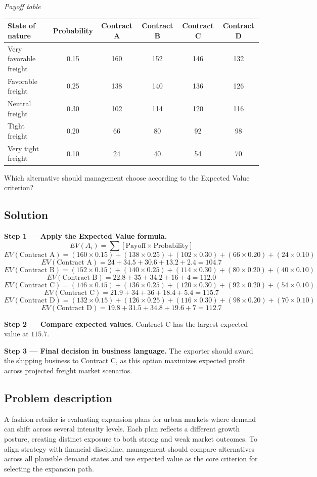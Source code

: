 \begin{ExamProblems}
		\begin{center}
			\textit{Payoff table}
			\begin{tabular}{l c c c c c}
				\toprule
				State of nature & Probability & Contract A & Contract B & Contract C & Contract D \\
				\midrule
				Very favorable freight & 0.15 & 160 & 152 & 146 & 132 \\
				Favorable freight & 0.25 & 138 & 140 & 136 & 126 \\
				Neutral freight & 0.30 & 102 & 114 & 120 & 116 \\
				Tight freight & 0.20 & 66 & 80 & 92 & 98 \\
				Very tight freight & 0.10 & 24 & 40 & 54 & 70 \\
				\bottomrule
			\end{tabular}
		\end{center}

		Which alternative should management choose according to the Expected Value criterion?

		\subsection*{Solution}
		\textbf{Step 1 --- Apply the Expected Value formula.}
		\[
		EV(A_i)=\sum [\text{Payoff}\times\text{Probability}]
		\]
		\[
		EV(\text{Contract A})=(160\times0.15)+(138\times0.25)+(102\times0.30)+(66\times0.20)+(24\times0.10)
		\]
		\[
		EV(\text{Contract A})=24+34.5+30.6+13.2+2.4=104.7
		\]
		\[
		EV(\text{Contract B})=(152\times0.15)+(140\times0.25)+(114\times0.30)+(80\times0.20)+(40\times0.10)
		\]
		\[
		EV(\text{Contract B})=22.8+35+34.2+16+4=112.0
		\]
		\[
		EV(\text{Contract C})=(146\times0.15)+(136\times0.25)+(120\times0.30)+(92\times0.20)+(54\times0.10)
		\]
		\[
		EV(\text{Contract C})=21.9+34+36+18.4+5.4=115.7
		\]
		\[
		EV(\text{Contract D})=(132\times0.15)+(126\times0.25)+(116\times0.30)+(98\times0.20)+(70\times0.10)
		\]
		\[
		EV(\text{Contract D})=19.8+31.5+34.8+19.6+7=112.7
		\]
		
		\textbf{Step 2 --- Compare expected values.}
		Contract C has the largest expected value at $115.7$.
		
		\textbf{Step 3 --- Final decision in business language.}
		The exporter should award the shipping business to Contract C, as this option maximizes expected profit across projected freight market scenarios.		\item
		\subsection*{Problem description}
		A fashion retailer is evaluating expansion plans for urban markets where demand can shift across several intensity levels. Each plan reflects a different growth posture, creating distinct exposure to both strong and weak market outcomes. To align strategy with financial discipline, management should compare alternatives across all plausible demand states and use expected value as the core criterion for selecting the expansion path.


\end{ExamProblems}
